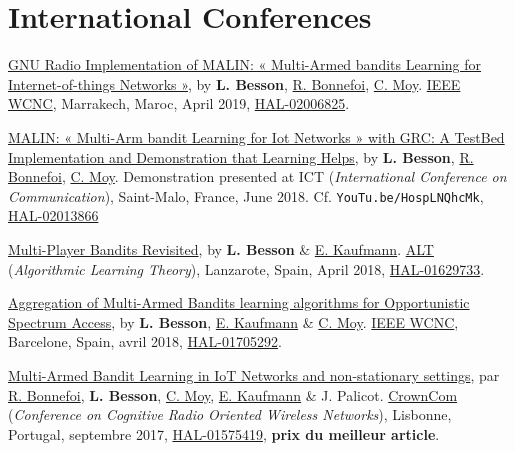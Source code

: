 \section*{International Conferences}
\renewcommand{\labelenumi}{[IC-\arabic{enumi}]}
\begin{etaremune}
\item
  \href{https://perso.crans.org/besson/articles/BBM__IEEE_WCNC_2019.pdf}{GNU
  Radio Implementation of MALIN: « Multi-Armed bandits Learning for
  Internet-of-things Networks »}, by \textbf{L. Besson},
  \href{https://remibonnefoi.wordpress.com/}{R. Bonnefoi},
  \href{https://moychris.wordpress.com/}{C. Moy}.
  \href{http://wcnc2019.ieee-wcnc.org/}{IEEE WCNC},
  Marrakech, Maroc, April 2019, \href{https://hal.inria.fr/hal-02006825}{HAL-02006825}.
\item
  \href{https://perso.crans.org/besson/articles/BBM__Demo_ICT_2018.pdf}{MALIN:
  « Multi-Arm bandit Learning for Iot Networks » with GRC: A TestBed
  Implementation and Demonstration that Learning Helps}, by \textbf{L.
  Besson}, \href{https://remibonnefoi.wordpress.com/}{R. Bonnefoi},
  \href{https://moychris.wordpress.com/}{C. Moy}. Demonstration
  presented at ICT (\emph{International Conference on Communication}),
  Saint-Malo, France, June 2018. Cf. \texttt{YouTu.be/HospLNQhcMk}, \href{https://hal.inria.fr/hal-02013866}{HAL-02013866}
\item
  \href{https://hal.inria.fr/hal-01629733/document}{Multi-Player Bandits
  Revisited}, by \textbf{L. Besson} \&
  \href{http://chercheurs.lille.inria.fr/ekaufman/research.html}{E.
  Kaufmann}.
  \href{http://www.cs.cornell.edu/conferences/alt2018/accepted.html}{ALT}
  (\emph{Algorithmic Learning Theory}), Lanzarote, Spain, April 2018,
  \href{https://hal.inria.fr/hal-01629733}{HAL-01629733}.
\item
  \href{https://hal.inria.fr/hal-01705292/document}{Aggregation of
  Multi-Armed Bandits learning algorithms for Opportunistic Spectrum
  Access}, by \textbf{L. Besson},
  \href{http://chercheurs.lille.inria.fr/ekaufman/research.html}{E.
  Kaufmann} \& \href{https://moychris.wordpress.com/}{C. Moy}.
  \href{http://wcnc2018.ieee-wcnc.org/}{IEEE WCNC}, Barcelone, Spain,
  avril 2018, \href{https://hal.inria.fr/hal-01705292}{HAL-01705292}.
\item
  \href{https://hal.inria.fr/hal-01575419/document}{Multi-Armed Bandit
  Learning in IoT Networks and non-stationary settings}, par
  \href{https://remibonnefoi.wordpress.com/}{R. Bonnefoi}, \textbf{L.
  Besson}, \href{https://moychris.wordpress.com/}{C. Moy},
  \href{http://chercheurs.lille.inria.fr/ekaufman/research.html}{E.
  Kaufmann} \& J. Palicot. \href{http://crowncom.org/2017/}{CrownCom}
  (\emph{Conference on Cognitive Radio Oriented Wireless Networks}),
  Lisbonne, Portugal, septembre 2017,
  \href{https://hal.inria.fr/hal-01575419}{HAL-01575419}, \textbf{prix
  du meilleur article}.
\end{etaremune}


